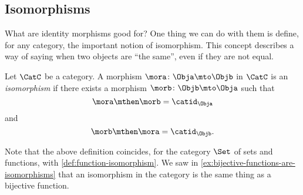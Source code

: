 
\subsection{Isomorphisms}

What are identity morphisms good for? One thing we can do with them is define, for any category, the important notion of isomorphism.
This concept describes a way of saying when two objects are ``the same'', even if they are not equal.

\begin{definition}\label{def:isomorphism-in-any-cat}
    Let $\CatC$ be a category.
    A morphism $\mora \colon \Obja \mto \Objb$ in $\CatC$ is an \emph{isomorphism} if there exists a morphism $\morb \colon \Objb \mto \Obja$ such that
    \begin{equation}
        \mora \mthen \morb = \catid_\Obja
    \end{equation}
    and
    \begin{equation}
        \morb \mthen \mora = \catid_\Objb.
    \end{equation}
\end{definition}

\begin{remark}
    Note that the above definition coincides, for the category $\Set$ of sets and functions, with \cref{def:function-isomorphism}.
    We saw in \cref{ex:bijective-functions-are-isomorphisms} that an isomorphism in the category \Set is the same thing as a bijective function.
\end{remark}

